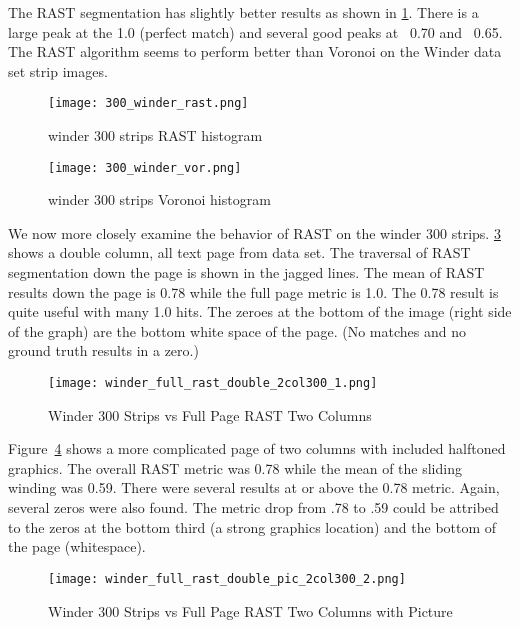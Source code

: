 \documentclass[conference]{IEEEtran}
\begin{document}
The RAST segmentation has slightly better results as shown in
\ref{fig:300-winder-rast}. There is a large peak at the 1.0 (perfect match) and
several good peaks at ~0.70 and ~0.65. The RAST algorithm seems to perform
better than Voronoi on the Winder data set strip images. 

\begin{figure}[300-winder-rast]
\texttt{[image: 300\_winder\_rast.png]}
\caption{winder 300 strips RAST histogram}
\label{fig:300-winder-rast}
\end{figure}
\begin{figure}[300-winder-vor]
\texttt{[image: 300\_winder\_vor.png]}
\caption{winder 300 strips Voronoi histogram}
\label{fig:300-winder-vor}
\end{figure}

We now more closely examine the behavior of RAST on the winder 300 strips.
\ref{fig:winder-300-double-2col300} shows a double column, all
text page from \cite{IEEEhowto:Winder} data set. The traversal of RAST
segmentation down the page is shown in the jagged lines. The mean of RAST
results down the page is 0.78 while the full page metric is 1.0.  The 0.78
result is quite useful with many 1.0 hits. The zeroes at the bottom of the
image (right side of the graph) are the bottom white space of the page. (No
matches and no ground truth results in a zero.)

\begin{figure}[winder-300-double-2col300]
\texttt{[image: winder\_full\_rast\_double\_2col300\_1.png]}
\caption{Winder 300 Strips vs Full Page RAST Two Columns}
\label{fig:winder-300-double-2col300}
\end{figure}

Figure~\ref{fig:winder-300-double-pic-2col300} shows a more complicated page of
two columns with included halftoned graphics. The overall RAST metric was 0.78
while the mean of the sliding winding was 0.59. There were several results at
or above the 0.78 metric. Again, several zeros were also found. The metric drop
from .78 to .59 could be attribed to the zeros at the bottom third (a strong
graphics location) and the bottom of the page (whitespace).

\begin{figure}[winder-300-double-pic-2col300]
\texttt{[image: winder\_full\_rast\_double\_pic\_2col300\_2.png]}
\caption{Winder 300 Strips vs Full Page RAST Two Columns with Picture}
\label{fig:winder-300-double-pic-2col300}
\end{figure}
\end{document}
